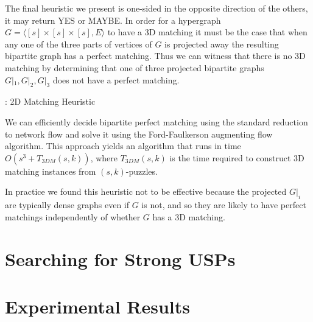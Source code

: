 \documentclass[11pt]{article}
\begin{document}
The final heuristic we present is one-sided in the opposite direction
of the others, it may return YES or MAYBE.  In order for a hypergraph
$G = \langle [s] \times [s] \times [s], E\rangle$ to have a 3D
matching it must be the case that when any one of the three parts of
vertices of $G$ is projected away the resulting bipartite graph has a
perfect matching.  Thus we can witness that there is no 3D matching by
determining that one of three projected bipartite graphs $G|_1, G|_2,
G|_3$ does not have a perfect matching. 

\begin{algorithm}
  \caption{: 2D Matching Heuristic}
  \label{alg:2dm}
\begin{algorithmic}[1]

  \Else
  \EndIf
\end{algorithmic}
\end{algorithm}

We can efficiently decide bipartite perfect matching using the
standard reduction to network flow and solve it using the
Ford-Faulkerson augmenting flow algorithm.  This approach yields an
algorithm that runs in time $O(s^3 + T_{3DM}(s,k))$, where
$T_{3DM}(s,k)$ is the time required to construct 3D matching instances
from $(s,k)$-puzzles.

In practice we found this heuristic not to be effective because the
projected $G|_i$ are typically dense graphs even if $G$ is not, and so
they are likely to have perfect matchings independently of whether $G$
has a 3D matching.







\section{Searching for Strong USPs}
\label{sec:search}

\section{Experimental Results}
\label{sec:results}
\end{document}

